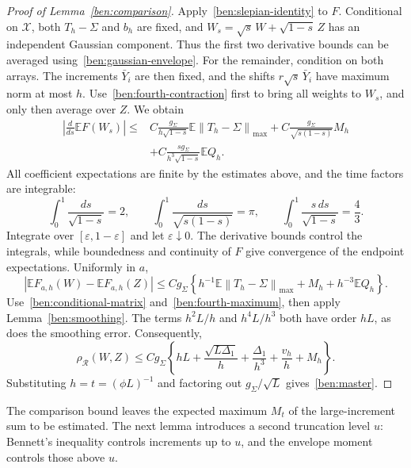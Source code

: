 \documentclass[11pt,letterpaper]{article}
\theoremstyle{remark}
\newcommand{\E}{\mathbb E}
\newcommand{\norm}[1]{\left\lVert#1\right\rVert}
\newcommand{\rh}{\rho_{\mathcal R}}
\begin{document}
\begin{proof}[Proof of Lemma~\ref{ben:comparison}]
Apply~\eqref{ben:slepian-identity} to $F$. Conditional on
$\mathcal X$, both $T_h-\Sigma$ and $b_h$ are fixed, and
$W_s=\sqrt s\,W+\sqrt{1-s}\,Z$ has an independent Gaussian
component. Thus the first two derivative bounds can be averaged
using~\eqref{ben:gaussian-envelope}. For the remainder, condition
on both arrays. The increments $\bar Y_i$ are then fixed, and
the shifts $r\sqrt s\,\bar Y_i$ have maximum norm at most $h$.
Use~\eqref{ben:fourth-contraction} first to bring all weights to
$W_s$, and only then average over $Z$. We obtain
\begin{align*}
 \left|\frac d{ds}\E F(W_s)\right|
 \le{}&C\frac{g_\Sigma}{h\sqrt{1-s}}
                \E\norm{T_h-\Sigma}_{\max}
       +C\frac{g_\Sigma}{\sqrt{s(1-s)}}M_h\\
 &+C\frac{sg_\Sigma}{h^3\sqrt{1-s}}\E Q_h.
\end{align*}
All coefficient expectations are finite by the estimates above,
and the time factors are integrable:
\[
 \int_0^1\frac{ds}{\sqrt{1-s}}=2,\qquad
 \int_0^1\frac{ds}{\sqrt{s(1-s)}}=\pi,\qquad
 \int_0^1\frac{s\,ds}{\sqrt{1-s}}=\frac43.
\]
Integrate over $[\varepsilon,1-\varepsilon]$ and let
$\varepsilon\downarrow0$. The derivative bounds control the
integrals, while boundedness and continuity of $F$ give convergence
of the endpoint expectations. Uniformly in $a$,
\[
 |\E F_{a,h}(W)-\E F_{a,h}(Z)|
 \le Cg_\Sigma\left\{
 h^{-1}\E\norm{T_h-\Sigma}_{\max}+M_h+h^{-3}\E Q_h\right\}.
\]
Use~\eqref{ben:conditional-matrix} and~\eqref{ben:fourth-maximum},
then apply Lemma~\ref{ben:smoothing}. The terms $h^2L/h$ and
$h^4L/h^3$ both have order $hL$, as does the smoothing error.
Consequently,
\[
 \rh(W,Z)\le Cg_\Sigma\left\{
 hL+\frac{\sqrt{L\Delta_1}}h
 +\frac{\Delta_1}{h^3}+\frac{v_h}h+M_h\right\}.
\]
Substituting $h=t=(\phi L)^{-1}$ and factoring out
$g_\Sigma/\sqrt L$ gives~\eqref{ben:master}.
\end{proof}

The comparison bound leaves the expected maximum $M_t$ of the
large-increment sum to be estimated. The next lemma introduces
a second truncation level $u$: Bennett's inequality controls
increments up to $u$, and the envelope moment controls those
above $u$.
\end{document}
